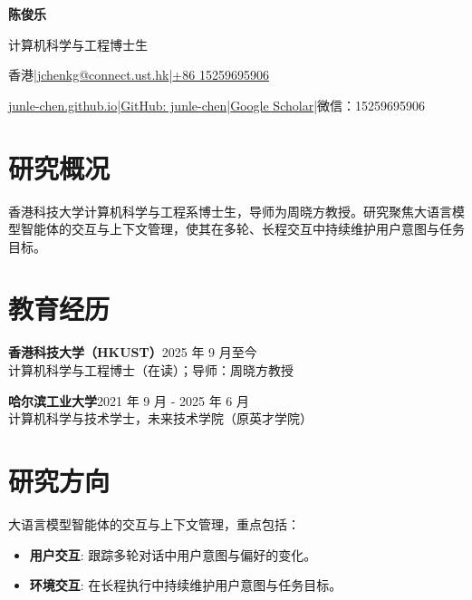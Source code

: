 \documentclass[10pt,a4paper]{article}
\begin{document}
\fontsize{9.7}{11.2}\selectfont
\begin{center}
{\fontsize{24}{32}\selectfont\bfseries 陈俊乐\par}\vspace{4pt}
{\fontsize{12}{18}\selectfont 计算机科学与工程博士生\par}\vspace{3pt}
香港\enspace|\enspace \href{mailto:jchenkg@connect.ust.hk}{jchenkg@connect.ust.hk}\enspace|\enspace \href{tel:+8615259695906}{+86 15259695906}\par\vspace{2pt}
\href{https://junle-chen.github.io}{junle-chen.github.io}\enspace|\enspace \href{https://github.com/junle-chen}{GitHub: junle-chen}\enspace|\enspace \href{https://scholar.google.com/citations?user=EjiEmLUAAAAJ&hl=zh-CN}{Google Scholar}\enspace|\enspace 微信：15259695906
\end{center}
\vspace{-8pt}
\section*{研究概况}

香港科技大学计算机科学与工程系博士生，导师为周晓方教授。研究聚焦大语言模型智能体的交互与上下文管理，使其在多轮、长程交互中持续维护用户意图与任务目标。
\section*{教育经历}

\noindent\textbf{香港科技大学（HKUST）}\hfill 2025 年 9 月至今\\
计算机科学与工程博士（在读）；导师：周晓方教授\par\vspace{3pt}
\noindent\textbf{哈尔滨工业大学}\hfill 2021 年 9 月 - 2025 年 6 月\\
计算机科学与技术学士，未来技术学院（原英才学院）\par\vspace{3pt}
\section*{研究方向}

大语言模型智能体的交互与上下文管理，重点包括：
\begin{itemize}[leftmargin=12pt,itemsep=1pt,topsep=2pt]
\item \textbf{用户交互}: 跟踪多轮对话中用户意图与偏好的变化。
\item \textbf{环境交互}: 在长程执行中持续维护用户意图与任务目标。
\end{itemize}
\end{document}
